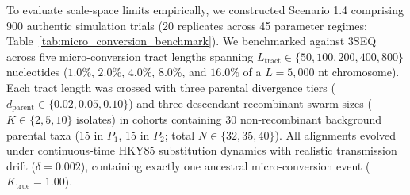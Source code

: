 To evaluate scale-space limits empirically, we constructed Scenario 1.4 comprising 900 authentic simulation trials (20 replicates across 45 parameter regimes; Table~\ref{tab:micro_conversion_benchmark}).
We benchmarked \RhizAeon against 3SEQ across five micro-conversion tract lengths spanning $L_{\text{tract}} \in \{50, 100, 200, 400, 800\}$ nucleotides ($1.0\%$, $2.0\%$, $4.0\%$, $8.0\%$, and $16.0\%$ of a $L = 5,000$ nt chromosome).
Each tract length was crossed with three parental divergence tiers ($d_{\text{parent}} \in \{0.02, 0.05, 0.10\}$) and three descendant recombinant swarm sizes ($K \in \{2, 5, 10\}$ isolates) in cohorts containing 30 non-recombinant background parental taxa (15 in $P_1$, 15 in $P_2$; total $N \in \{32, 35, 40\}$).
All alignments evolved under continuous-time HKY85 substitution dynamics with realistic transmission drift ($\delta = 0.002$), containing exactly one ancestral micro-conversion event ($K_{\text{true}} = 1.00$).

